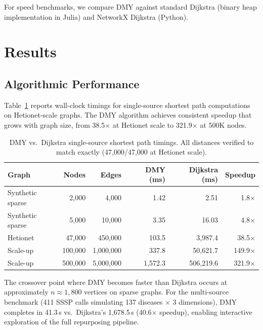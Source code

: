 \documentclass[11pt,a4paper]{article}
\begin{document}
For speed benchmarks, we compare DMY against standard Dijkstra
(binary heap implementation in Julia) and NetworkX Dijkstra (Python).

\section{Results}
\label{sec:results}

\subsection{Algorithmic Performance}
\label{sec:results:speed}

Table~\ref{tab:speed} reports wall-clock timings for single-source
shortest path computations on Hetionet-scale graphs. The DMY algorithm
achieves consistent speedup that grows with graph size, from 38.5$\times$
at Hetionet scale to 321.9$\times$ at 500K nodes.

\begin{table}[t]
\centering
\caption{DMY vs.\ Dijkstra single-source shortest path timings.
All distances verified to match exactly (47,000/47,000 at Hetionet scale).}
\label{tab:speed}
\begin{tabular}{lrrrrr}
\toprule
\textbf{Graph} & \textbf{Nodes} & \textbf{Edges} &
\textbf{DMY (ms)} & \textbf{Dijkstra (ms)} & \textbf{Speedup} \\
\midrule
Synthetic sparse  & 2,000   & 4,000      & 1.42    & 2.51     & 1.8$\times$ \\
Synthetic sparse  & 5,000   & 10,000     & 3.35    & 16.03    & 4.8$\times$ \\
Hetionet          & 47,000  & 450,000    & 103.5   & 3,987.4  & 38.5$\times$ \\
Scale-up          & 100,000 & 1,000,000  & 337.8   & 50,621.7 & 149.9$\times$ \\
Scale-up          & 500,000 & 5,000,000  & 1,572.3 & 506,219.6 & 321.9$\times$ \\
\bottomrule
\end{tabular}
\end{table}

The crossover point where DMY becomes faster than Dijkstra occurs at
approximately $n \approx 1{,}800$ vertices on sparse graphs.
For the multi-source benchmark (411 SSSP calls simulating 137 diseases
$\times$ 3 dimensions), DMY completes in 41.3\,s vs.\ Dijkstra's
1,678.5\,s (40.6$\times$ speedup), enabling interactive exploration
of the full repurposing pipeline.
\end{document}
